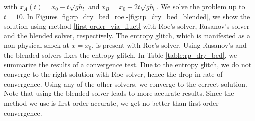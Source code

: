 \documentclass[preprint, 11pt]{article}
\begin{document}
with $x_A(t)=x_0 - t\sqrt{gh_l}$ and $x_B=x_0+2t\sqrt{gh_l}$.
We solve the problem up to $t=10$.
In Figures \ref{fig:rp_dry_bed_roe}-\ref{fig:rp_dry_bed_blended},
we show the solution using method \eqref{first-order_via_fluct}
with Roe's solver, Rusanov's solver and the blended solver, respectively.
The entropy glitch, which is manifested as a non-physical shock at $x=x_0$,
is present with Roe's solver. Using Rusanov's and the blended solvers
fixes the entropy glitch.
In Table \ref{table:rp_dry_bed}, we summarize the results of a convergence test.
Due to the entropy glitch, we do not converge to the right solution with Roe solver,
hence the drop in rate of convergence. Using any of the other solvers, we converge to the 
correct solution. Note that using the blended solver leads to more accurate results. 
Since the method we use is first-order accurate, we get no better than first-order convergence.
\end{document}
